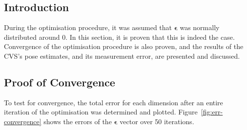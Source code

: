 \subsection{Introduction}

During the optimisation procedure, it was assumed that $\bm{\epsilon}$ was normally distributed around 0. In this section, it is proven that this is indeed the case. Convergence of the optimisation procedure is also proven, and the results of the CVS's pose estimates, and its measurement error, are presented and discussed.

\subsection{Proof of Convergence}

To test for convergence, the total error for each dimension after an entire iteration of the optimisation was determined and plotted. Figure~\ref{fig:err-convergence} shows the errors of the $\bm{\epsilon}$ vector over 50 iterations.

